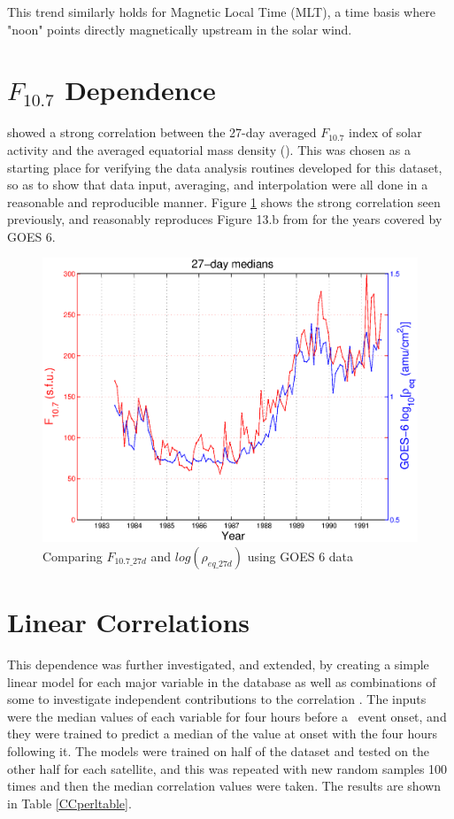 This trend similarly holds for Magnetic Local Time (MLT), a time basis where "noon" points directly magnetically upstream in the solar wind.   

\section{$F_{10.7}$ Dependence}
\cite{Takahashi2010SolarCycleVariation} showed a strong correlation between the 27-day averaged $F_{10.7}$ index of solar activity and the averaged equatorial mass density (\req). This was chosen as a starting place for verifying the data analysis routines developed for this dataset, so as to show that data input, averaging, and interpolation were all done in a reasonable and reproducible manner. Figure \ref{fig:F107rhoeq27dcomparison} shows the strong correlation seen previously, and reasonably reproduces Figure 13.b from \cite{Takahashi2010SolarCycleVariation} for the years covered by GOES 6.

\begin{figure}
\centering
\includegraphics[width=0.7\linewidth]{Figures/F107MD27d-GOES6}
\caption{Comparing $F_{10.7\_27d}$ and $log(\rho_{eq\_27d})$ using GOES 6 data }
\label{fig:F107rhoeq27dcomparison}
\end{figure}

\section{Linear Correlations}
This dependence was further investigated, and extended, by creating a simple linear model for each major variable in the database as well as combinations of some to investigate independent contributions to the correlation . The inputs were the median values of each variable for four hours before a \dst\ event onset, and they were trained to predict a median of the value at onset with the four hours following it. The models were trained on half of the dataset and tested on the other half for each satellite, and this was repeated with new random samples 100 times and then the median correlation values were taken. The results are shown in Table \ref{CCperltable}.

